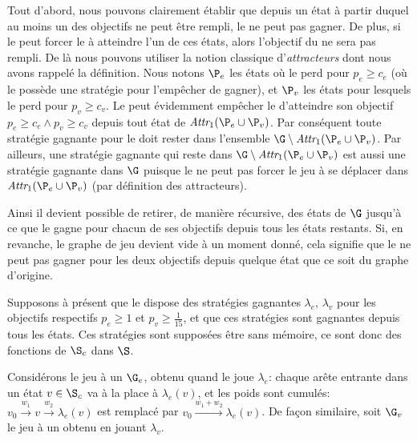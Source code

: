 Tout d'abord, nous pouvons clairement établir que depuis un état à partir duquel au moins un des objectifs ne peut être rempli, le \jo ne peut pas gagner.
De plus, si le \ji peut forcer le \jo à atteindre l'un de ces états, alors l'objectif du \jo ne sera pas rempli.
De là nous pouvons utiliser la notion classique d'\emph{attracteurs} dont nous avons rappelé la définition.
Nous notons $\P_e$ les états où le \jo perd pour $p_e \geq c_e$ (\cad où le \ji possède une stratégie pour l'empêcher de gagner), et $\P_v$ les états pour lesquels le \jo perd pour $p_v \geq c_v$.
Le \ji peut évidemment empêcher le \jo d'atteindre son objectif $p_e \geq c_e \wedge p_v \geq c_v$ depuis tout état de $\attractor{1}(\P_e \cup \P_v)$.
Par conséquent toute stratégie gagnante pour le \jo doit rester dans l'ensemble $\G \setminus\attractor{1}(\P_e \cup \P_v)$.
Par ailleurs, une stratégie gagnante qui reste dans $\G \setminus\attractor{1}(\P_e \cup \P_v)$ est aussi une stratégie gagnante dans $\G$ puisque le \ji ne peut pas forcer le jeu à se déplacer dans $\attractor{1}(\P_e \cup \P_v)$ (par définition des attracteurs).

Ainsi il devient possible de retirer, de manière récursive, des états de $\G$ jusqu'à ce que le \jo gagne pour chacun de ses objectifs depuis tous les états restants.
Si, en revanche, le graphe de jeu devient vide à un moment donné, cela signifie que le \jo ne peut pas gagner pour les deux objectifs depuis quelque état que ce soit du graphe d'origine.

Supposons à présent que le \jo dispose des stratégies gagnantes $\lambda_e$, $\lambda_v$ pour les objectifs respectifs $p_e \geq 1$ et $p_v \geq \frac1{15}$, et que ces stratégies sont gagnantes depuis tous les états.
Ces stratégies sont supposées être sans mémoire, ce sont donc des fonctions de $\S_c$ dans $\S$.

Considérons le jeu à un  $\G_e$, obtenu quand le \jo joue $\lambda_e$: chaque arête entrante dans un état $v \in \S_c$ va à la place à $\lambda_e(v)$, et les poids sont cumulés: $v_0 \xrightarrow{w_1} v \xrightarrow{w_2} \lambda_e(v)$ est remplacé par $v_0 \xrightarrow{w_1+w_2} \lambda_e(v)$.
De façon similaire, soit $\G_v$ le jeu à un  obtenu en jouant $\lambda_v$.

